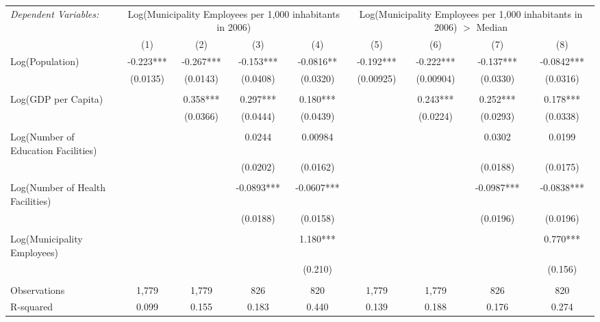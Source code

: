 \documentclass[]{article}
\begin{document}
\begin{table}[ht!]
\centering
\begin{adjustbox}{max width=\textwidth}
\begin{tabular}{lcccccccc}
\toprule
 \textit{Dependent Variables:} & \multicolumn{4}{c}{{Log(Municipality Employees per 1,000 inhabitants in 2006)}} & \multicolumn{4}{c}{{Log(Municipality Employees per 1,000 inhabitants in 2006) $>$ Median}} \\ 
\cmidrule(lr){2-5} \cmidrule(lr){6-9}
& (1) & (2) & (3) & (4) & (5) & (6) & (7) & (8) \\ 
\midrule
Log(Population) & -0.223*** & -0.267*** & -0.153*** & -0.0816** & -0.192*** & -0.222*** & -0.137*** & -0.0842*** \\ 
 & (0.0135) & (0.0143) & (0.0408) & (0.0320) & (0.00925) & (0.00904) & (0.0330) & (0.0316) \\ \\
Log(GDP per Capita) &  & 0.358*** & 0.297*** & 0.180*** &  & 0.243*** & 0.252*** & 0.178*** \\ 
 &  & (0.0366) & (0.0444) & (0.0439) &  & (0.0224) & (0.0293) & (0.0338) \\ \\
Log(Number of Education Facilities) &  &  & 0.0244 & 0.00984 &  &  & 0.0302 & 0.0199 \\ 
 &  &  & (0.0202) & (0.0162) &  &  & (0.0188) & (0.0175) \\ \\
Log(Number of Health Facilities) &  &  & -0.0893*** & -0.0607*** &  &  & -0.0987*** & -0.0838*** \\ 
 &  &  & (0.0188) & (0.0158) &  &  & (0.0196) & (0.0196) \\ \\
Log(Municipality Employees) &  &  &  & 1.180*** &  &  &  & 0.770*** \\ 
 &  &  &  & (0.210) &  &  &  & (0.156) \\ \\
\midrule
Observations & 1,779 & 1,779 & 826 & 820 & 1,779 & 1,779 & 826 & 820 \\ 
R-squared & 0.099 & 0.155 & 0.183 & 0.440 & 0.139 & 0.188 & 0.176 & 0.274 \\ 
\bottomrule
\end{tabular}
\end{adjustbox}
\end{table}
\end{document}
